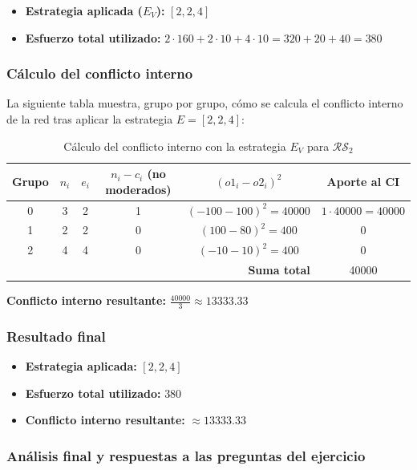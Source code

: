 \documentclass[11pt,letter]{article}
\begin{document}
\begin{itemize}
    \item \textbf{Estrategia aplicada ($E_V$): } $[2, 2, 4]$
    \item \textbf{Esfuerzo total utilizado:} $2 \cdot 160 + 2 \cdot 10 + 4 \cdot 10 = 320 + 20 + 40 = 380$
\end{itemize}

\subsubsection*{Cálculo del conflicto interno}

La siguiente tabla muestra, grupo por grupo, cómo se calcula el conflicto interno de la red tras aplicar la estrategia $E = [2, 2, 4]$:

\begin{table}[H]
\centering
\begin{tabular}{c|c|c|c|c|c}
\textbf{Grupo} & $n_i$ & $e_i$ & $n_i - c_i$ (no moderados) & $(o1_i - o2_i)^2$ & Aporte al CI \\
\hline
0 & 3 & 2 & 1 & $( -100 - 100 )^2 = 40000$ & $1 \cdot 40000 = 40000$ \\
1 & 2 & 2 & 0 & $(100 - 80)^2 = 400$ & $0$ \\
2 & 4 & 4 & 0 & $(-10 - 10)^2 = 400$ & $0$ \\
\hline
\multicolumn{5}{r|}{\textbf{Suma total}} & 40000 \\
\end{tabular}
\caption{Cálculo del conflicto interno con la estrategia $E_V$ para $\mathcal{RS}_2$}
\end{table}

\textbf{Conflicto interno resultante:} $\frac{40000}{3} \approx 13333.33$

\subsubsection*{Resultado final}

\begin{itemize}
    \item \textbf{Estrategia aplicada:} $[2, 2, 4]$
    \item \textbf{Esfuerzo total utilizado:} $380$
    \item \textbf{Conflicto interno resultante:} $\approx 13333.33$
\end{itemize}

\subsubsection*{Análisis final y respuestas a las preguntas del ejercicio}
\end{document}
